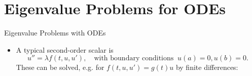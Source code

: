 %
%
%
%
%
%

\section{Eigenvalue Problems for ODEs}

\begin{frame}{Eigenvalue Problems with ODEs}

\begin{itemize}
\item A typical second-order scalar  is
\[u'' = \lambda f(t,u,u'), \quad \text{with boundary conditions } \  u(a)=0, u(b)=0.\]
These can be solved, e.g. for $f(t,u,u')=g(t)u$ by finite differences:

\lgcond{}
\end{itemize}

\end{frame}

